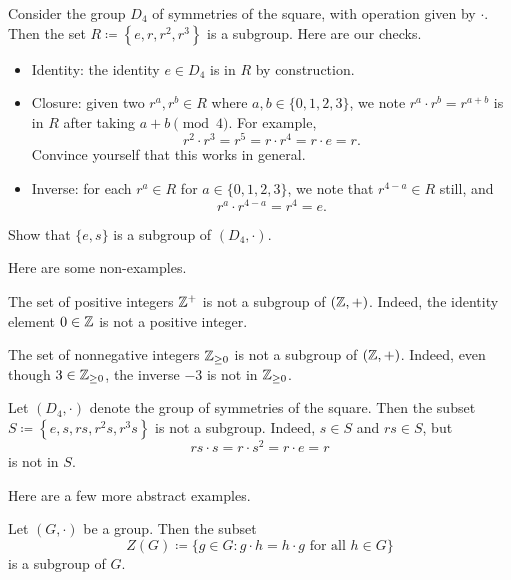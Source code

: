 \documentclass[../main.tex]{subfiles}
\begin{document}
\begin{example}
    Consider the group $D_4$ of symmetries of the square, with operation given by $\cdot$. Then the set $R\coloneqq\left\{e,r,r^2,r^3\right\}$ is a subgroup. Here are our checks.
    \begin{itemize}
        \item Identity: the identity $e\in D_4$ is in $R$ by construction.
        \item Closure: given two $r^a,r^b\in R$ where $a,b\in\{0,1,2,3\}$, we note $r^a\cdot r^b=r^{a+b}$ is in $R$ after taking $a+b\pmod4$. For example,
        \[r^2\cdot r^3=r^5=r\cdot r^4=r\cdot e=r.\]
        Convince yourself that this works in general.
        \item Inverse: for each $r^a\in R$ for $a\in\{0,1,2,3\}$, we note that $r^{4-a}\in R$ still, and
        \[r^a\cdot r^{4-a}=r^4=e.\]
    \end{itemize}
\end{example}
\begin{exe}
    Show that $\{e,s\}$ is a subgroup of $(D_4,\cdot)$.
\end{exe}
Here are some non-examples.
\begin{nex}
    The set of positive integers $\mathbb Z^+$ is not a subgroup of $(\mathbb Z,+)$. Indeed, the identity element $0\in\mathbb Z$ is not a positive integer.
\end{nex}
\begin{nex}
    The set of nonnegative integers $\mathbb Z_{\ge0}$ is not a subgroup of $(\mathbb Z,+)$. Indeed, even though $3\in\mathbb Z_{\ge0}$, the inverse $-3$ is not in $\mathbb Z_{\ge0}$.
\end{nex}
\begin{nex}
    Let $(D_4,\cdot)$ denote the group of symmetries of the square. Then the subset $S\coloneqq\left\{e,s,rs,r^2s,r^3s\right\}$ is not a subgroup. Indeed, $s\in S$ and $rs\in S$, but
    \[rs\cdot s=r\cdot s^2=r\cdot e=r\]
    is not in $S$.
\end{nex}
Here are a few more abstract examples.
\begin{proposition} \label{prop:center}
    Let $(G,\cdot)$ be a group. Then the subset
    \[Z(G)\coloneqq\{g\in G:g\cdot h=h\cdot g\text{ for all }h\in G\}\]
    is a subgroup of $G$.
\end{proposition}
\end{document}
